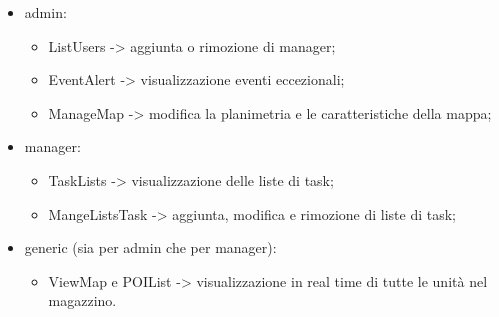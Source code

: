 \begin{itemize}
	\item admin:
	\begin{itemize}
		\item ListUsers -> aggiunta o rimozione di manager;
		\item EventAlert -> visualizzazione eventi eccezionali;
		\item ManageMap -> modifica la planimetria e le caratteristiche della mappa;
	\end{itemize}
	\item manager:
	\begin{itemize}
		\item TaskLists -> visualizzazione delle liste di task;
		\item MangeListsTask -> aggiunta, modifica e rimozione di liste di task;
	\end{itemize}
	\item generic (sia per admin che per manager):
	\begin{itemize}
		\item ViewMap e POIList -> visualizzazione in real time di tutte le unità nel magazzino.
	\end{itemize}
\end{itemize}




